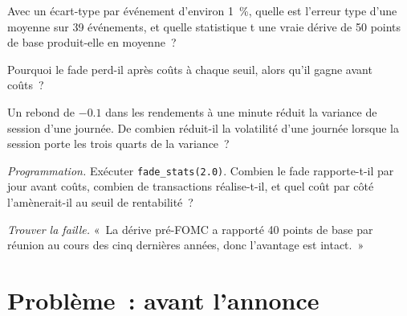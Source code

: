 \begin{exercise}[$\star\star$]\label{exo:s1:short-term-futures-strategies:4}
Avec un écart-type par événement d'environ 1~\%, quelle est l'erreur type d'une moyenne sur 39 événements, et quelle statistique t une vraie dérive de 50
points de base produit-elle en moyenne~?
\end{exercise}

\begin{exercise}[$\star\star$]\label{exo:s1:short-term-futures-strategies:5}
Pourquoi le fade perd-il après coûts à chaque seuil, alors qu'il gagne avant coûts~?
\end{exercise}

\begin{exercise}[$\star\star$]\label{exo:s1:short-term-futures-strategies:6}
Un rebond de $-0.1$ dans les rendements à une minute réduit la variance de session d'une journée. De combien réduit-il la volatilité d'une journée lorsque la session porte les trois
quarts de la variance~?
\end{exercise}

\begin{exercise}[$\star\star\star$]\label{exo:s1:short-term-futures-strategies:7}
\emph{Programmation.} Exécuter \texttt{fade\_stats(2.0)}. Combien le fade rapporte-t-il par jour avant coûts, combien de transactions réalise-t-il, et quel coût par côté
l'amènerait-il au seuil de rentabilité~?
\end{exercise}

\begin{exercise}[$\star\star\star$]\label{exo:s1:short-term-futures-strategies:8}
\emph{Trouver la faille.} «~La dérive pré-FOMC a rapporté 40 points de base par réunion au cours des cinq dernières années, donc l'avantage est intact.~»
\end{exercise}

\section{Problème~: avant l'annonce}

